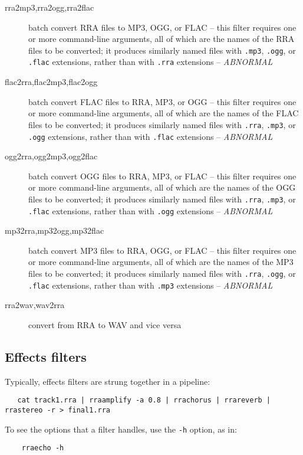 \documentclass{article}
\begin{document}
\begin{description}
\item[rra2mp3,rra2ogg,rra2flac]
batch convert RRA files to MP3, OGG, or FLAC --
this filter requires one or more command-line arguments, all
of which are the names of the RRA files to be converted;
it produces similarly named files with 
\verb!.mp3!, \verb!.ogg!, or \verb!.flac! extensions,
rather than with \verb!.rra! extensions -- {\it ABNORMAL}
\item[flac2rra,flac2mp3,flac2ogg]
batch convert FLAC files to RRA, MP3, or OGG --
this filter requires one or more command-line arguments, all
of which are the names of the FLAC files to be converted;
it produces similarly named files with
\verb!.rra!, \verb!.mp3!, or \verb!.ogg! extensions,
rather than with \verb!.flac! extensions -- {\it ABNORMAL}
\item[ogg2rra,ogg2mp3,ogg2flac]
batch convert OGG files to RRA, MP3, or FLAC --
this filter requires one or more command-line arguments, all
of which are the names of the OGG files to be converted;
it produces similarly named files with
\verb!.rra!, \verb!.mp3!, or \verb!.flac! extensions,
rather than with \verb!.ogg! extensions -- {\it ABNORMAL}
\item[mp32rra,mp32ogg,mp32flac]
batch convert MP3 files to RRA, OGG, or FLAC --
this filter requires one or more command-line arguments, all
of which are the names of the MP3 files to be converted;
it produces similarly named files with
\verb!.rra!, \verb!.ogg!, or \verb!.flac! extensions,
rather than with \verb!.mp3! extensions -- {\it ABNORMAL}
\item[rra2wav,wav2rra]
convert from RRA to WAV and vice versa
\end{description}

\subsection*{Effects filters}

Typically, effects filters are strung together in a pipeline:

\begin{verbatim}
   cat track1.rra | rraamplify -a 0.8 | rrachorus | rrareverb | rrastereo -r > final1.rra
\end{verbatim}

To see the options that a filter handles, use the \verb!-h! option, as in:

\begin{verbatim}
    rraecho -h
\end{verbatim}
\end{document}
